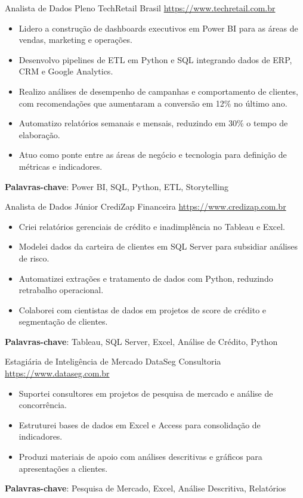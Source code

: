 \documentclass[a4paper, serif, 10pt]{moderncv}
\begin{document}
        {Analista de Dados Pleno}
        {TechRetail Brasil}
        {\url{https://www.techretail.com.br}}
        {}
        {\begin{itemize}
\item Lidero a construção de dashboards executivos em Power BI para as áreas
de vendas, marketing e operações.
\item Desenvolvo pipelines de ETL em Python e SQL integrando dados de ERP,
CRM e Google Analytics.
\item Realizo análises de desempenho de campanhas e comportamento de
clientes, com recomendações que aumentaram a conversão em 12\% no
último ano.
\item Automatizo relatórios semanais e mensais, reduzindo em 30\% o tempo de
elaboração.
\item Atuo como ponte entre as áreas de negócio e tecnologia para definição
de métricas e indicadores.
\end{itemize}
\textbf{Palavras-chave}: Power BI, SQL, Python, ETL, Storytelling}

        {Analista de Dados Júnior}
        {CrediZap Financeira}
        {\url{https://www.credizap.com.br}}
        {}
        {\begin{itemize}
\item Criei relatórios gerenciais de crédito e inadimplência no Tableau e
Excel.
\item Modelei dados da carteira de clientes em SQL Server para subsidiar
análises de risco.
\item Automatizei extrações e tratamento de dados com Python, reduzindo
retrabalho operacional.
\item Colaborei com cientistas de dados em projetos de score de crédito e
segmentação de clientes.
\end{itemize}
\textbf{Palavras-chave}: Tableau, SQL Server, Excel, Análise de Crédito, Python}

        {Estagiária de Inteligência de Mercado}
        {DataSeg Consultoria}
        {\url{https://www.dataseg.com.br}}
        {}
        {\begin{itemize}
\item Suportei consultores em projetos de pesquisa de mercado e análise de
concorrência.
\item Estruturei bases de dados em Excel e Access para consolidação de
indicadores.
\item Produzi materiais de apoio com análises descritivas e gráficos para
apresentações a clientes.
\end{itemize}
\textbf{Palavras-chave}: Pesquisa de Mercado, Excel, Análise Descritiva, Relatórios}
\end{document}

